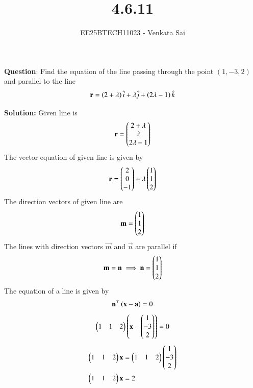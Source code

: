 \documentclass[journal]{IEEEtran}
\begin{document}


\title{4.6.11}
\author{EE25BTECH11023 - Venkata Sai}
{\let\newpage\relax\maketitle}

\renewcommand{\thefigure}{\theenumi}
\renewcommand{\thetable}{\theenumi}
\setlength{\intextsep}{10pt} %


\renewcommand{\thetable}{\theenumi}

\textbf{Question}:\newline
Find the equation of the line passing through the point $(1, -3, 2)$ and parallel to the line
\begin{align}
 \mathbf{r} = \left(2 + \lambda\right)\hat{i} + \lambda\hat{j} + \left(2\lambda - 1\right)\hat{k} 
\end{align}


\textbf{Solution: }
Given line is
\begin{align}
 \mathbf{r} = \begin{pmatrix}2+\lambda\\\lambda\\2\lambda-1\end{pmatrix}
\end{align}
The vector equation of given line is given by
\begin{align}
\mathbf{r}=\begin{pmatrix}2\\0\\-1\end{pmatrix}+\lambda\begin{pmatrix}1\\1\\2\end{pmatrix}
\end{align}
The direction vectors of given line are
\begin{align}
    \mathbf{m}=\begin{pmatrix}1\\1\\2\end{pmatrix}
\end{align}
The lines with direction vectors $\vec{m}$ and $\vec{n}$ are parallel if
\begin{align}
\mathbf{m}=\mathbf{n}  \implies  \mathbf{n}=\begin{pmatrix}1\\1\\2\end{pmatrix}
\end{align}
The equation of a line is given by
\begin{align}
\mathbf{n}^\top\left(\mathbf{x}-\mathbf{a}\right)=0  
\end{align}
\begin{align}
\begin{pmatrix}1&1&2\end{pmatrix}\left(\mathbf{x}-\begin{pmatrix}1\\-3\\2\end{pmatrix}\right)=0 
\end{align}
\begin{align}
\begin{pmatrix}1&1&2\end{pmatrix}\mathbf{x}&=\begin{pmatrix}1&1&2\end{pmatrix}\begin{pmatrix}1\\-3\\2\end{pmatrix} \\
\begin{pmatrix}1&1&2\end{pmatrix}\mathbf{x}&=2
\end{align}
\end{document}
